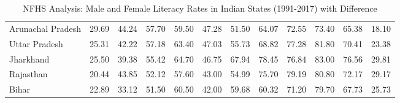 \begin{table}[h]
{\begin{tabular}{lccccccccccc}
        Arunachal Pradesh & 29.69 & 44.24 & 57.70 & 59.50 & 47.28 & 51.50 & 64.07 & 72.55 & 73.40 & 65.38 & 18.10 \\
        Uttar Pradesh   & 25.31 & 42.22 & 57.18 & 63.40 & 47.03 & 55.73 & 68.82 & 77.28 & 81.80 & 70.41 & 23.38 \\
        Jharkhand       & 25.50 & 39.38 & 55.42 & 64.70 & 46.75 & 67.94 & 78.45 & 76.84 & 83.00 & 76.56 & 29.81 \\
        Rajasthan       & 20.44 & 43.85 & 52.12 & 57.60 & 43.00 & 54.99 & 75.70 & 79.19 & 80.80 & 72.17 & 29.17 \\
        Bihar           & 22.89 & 33.12 & 51.50 & 60.50 & 42.00 & 59.68 & 60.32 & 71.20 & 79.70 & 67.73 & 25.73 \\
        \bottomrule
    \end{tabular}
    }
    \caption{NFHS Analysis: Male and Female Literacy Rates in Indian States (1991-2017) with Difference}
    \label{tab:combined_literacy_states_diff}
\end{table}

